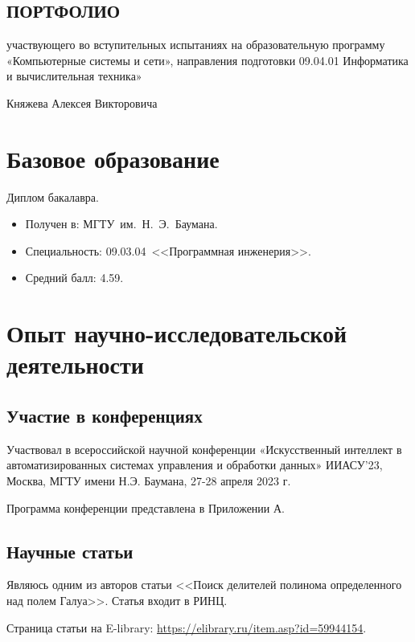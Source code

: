 \documentclass[14pt]{extarticle}
\begin{document}
\pagestyle{empty}

\begin{center}
\section*{ПОРТФОЛИО}

участвующего во вступительных испытаниях на образовательную программу
«Компьютерные системы и сети», направления подготовки 09.04.01
Информатика и вычислительная техника»

Княжева Алексея Викторовича
\end{center}	

\section{Базовое образование}

Диплом бакалавра.

\begin{itemize}
	\item Получен в: МГТУ~им.~Н.~Э.~Баумана.
	\item Специальность: 09.03.04~<<Программная инженерия>>. 
	\item Средний балл: 4.59.
\end{itemize}

\section{Опыт научно-исследовательской деятельности}

\subsection{Участие в конференциях}

Участвовал в всероссийской научной конференции «Искусственный интеллект в автоматизированных системах управления и обработки данных» ИИАСУ'23, Москва, МГТУ имени Н.Э. Баумана, 27-28 апреля 2023 г.

Программа конференции представлена в Приложении А.

\subsection{Научные статьи}

Являюсь одним из авторов статьи <<Поиск делителей полинома определенного над полем Галуа>>. Статья входит в РИНЦ.

Страница статьи на E-library: \url{https://elibrary.ru/item.asp?id=59944154}.
\end{document}
